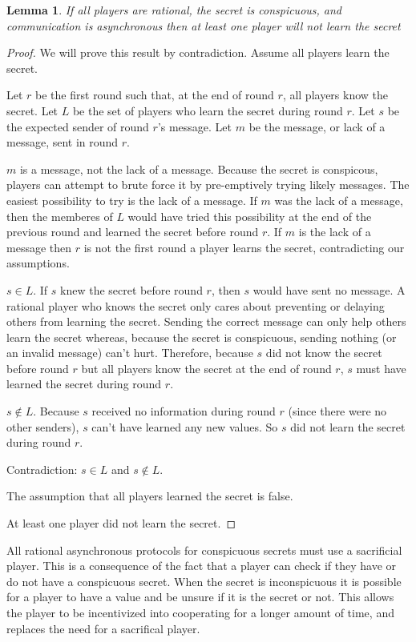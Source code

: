\documentclass{dalcsthesis}
\newtheorem{lemma}{Lemma}
\begin{document}
\begin{lemma} If all players are rational, the secret is conspicuous, and communication is asynchronous then at least one player will not learn the secret \end{lemma}
\begin{proof}
We will prove this result by contradiction. Assume all players learn the secret.

Let $r$ be the first round such that, at the end of round $r$, all players know the secret. Let $L$ be the set of players who learn the secret during round $r$. Let $s$ be the expected sender of round $r$'s message. Let $m$ be the message, or lack of a message, sent in round $r$.

$m$ is a message, not the lack of a message. Because the secret is conspicous, players can attempt to brute force it by pre-emptively trying likely messages. The easiest possibility to try is the lack of a message. If $m$ was the lack of a message, then the memberes of $L$ would have tried this possibility at the end of the previous round and learned the secret before round $r$. If $m$ is the lack of a message then $r$ is not the first round a player learns the secret, contradicting our assumptions.

$s \in L$. If $s$ knew the secret before round $r$, then $s$ would have sent no message. A rational player who knows the secret only cares about preventing or delaying others from learning the secret. Sending the correct message can only help others learn the secret whereas, because the secret is conspicuous, sending nothing (or an invalid message) can't hurt. Therefore, because $s$ did not know the secret before round $r$ but all players know the secret at the end of round $r$, $s$ must have learned the secret during round $r$.

$s \notin L$. Because $s$ received no information during round $r$ (since there were no other senders), $s$ can't have learned any new values. So $s$ did not learn the secret during round $r$.

Contradiction: $s \in L$ and $s \notin L$.

The assumption that all players learned the secret is false.

At least one player did not learn the secret.
\end{proof}

All rational asynchronous protocols for conspicuous secrets must use a sacrificial player. This is a consequence of the fact that a player can check if they have or do not have a conspicuous secret. When the secret is inconspicuous it is possible for a player to have a value and be unsure if it is the secret or not. This allows the player to be incentivized into cooperating for a longer amount of time, and replaces the need for a sacrifical player.
\end{document}
